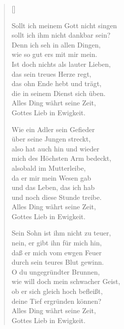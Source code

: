 \begin{multicols}{2}
\settowidth{\versewidth}{Sollt ich meinem Gott nicht singen}
\begin{verse}[\versewidth]

 Sollt ich meinem Gott nicht singen\\
sollt ich ihm nicht dankbar sein?\\
Denn ich seh in allen Dingen,\\
wie so gut ers mit mir mein.\\
Ist doch nichts als lauter Lieben,\\
das sein treues Herze regt,\\
das ohn Ende hebt und trägt,\\
die in seinem Dienst sich üben.\\
Alles Ding währt seine Zeit,\\
Gottes Lieb in Ewigkeit.

 Wie ein Adler sein Gefieder\\
über seine Jungen streckt,\\
also hat auch hin und wieder\\
mich des Höchsten Arm bedeckt,\\
alsobald im Mutterleibe,\\
da er mir mein Wesen gab\\
und das Leben, das ich hab\\
und noch diese Stunde treibe.\\
Alles Ding währt seine Zeit,\\
Gottes Lieb in Ewigkeit.

 Sein Sohn ist ihm nicht zu teuer,\\
nein, er gibt ihn für mich hin,\\
daß er mich vom ewgen Feuer\\
durch sein teures Blut gewinn.\\
O du ungegründter Brunnen,\\
wie will doch mein schwacher Geist,\\
ob er sich gleich hoch befleißt,\\
deine Tief ergründen können?\\
Alles Ding währt seine Zeit,\\
Gottes Lieb in Ewigkeit.


\end{verse}
\end{multicols}
